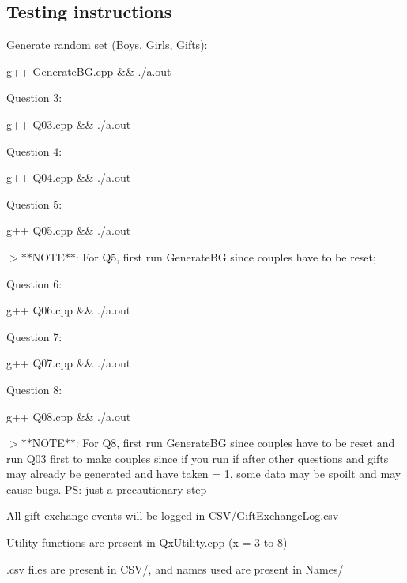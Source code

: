 \subsection*{Testing instructions}


\begin{DoxyItemize}
\item Generate random set (Boys, Girls, Gifts)\+: 
\begin{DoxyCode}
g++ GenerateBG.cpp && ./a.out
\end{DoxyCode}

\item Question 3\+: 
\begin{DoxyCode}
g++ Q03.cpp && ./a.out
\end{DoxyCode}

\item Question 4\+: 
\begin{DoxyCode}
g++ Q04.cpp && ./a.out
\end{DoxyCode}

\item Question 5\+: 
\begin{DoxyCode}
g++ Q05.cpp && ./a.out
\end{DoxyCode}
 $>$$\ast$$\ast$\+N\+O\+T\+E$\ast$$\ast$\+: For Q5, first run Generate\+BG since couples have to be reset;
\item Question 6\+: 
\begin{DoxyCode}
g++ Q06.cpp && ./a.out
\end{DoxyCode}

\item Question 7\+: 
\begin{DoxyCode}
g++ Q07.cpp && ./a.out
\end{DoxyCode}

\item Question 8\+: 
\begin{DoxyCode}
g++ Q08.cpp && ./a.out
\end{DoxyCode}
 $>$$\ast$$\ast$\+N\+O\+T\+E$\ast$$\ast$\+: For Q8, first run Generate\+BG since couples have to be reset and run Q03 first to make couples since if you run if after other questions and gifts may already be generated and have taken = 1, some data may be spoilt and may cause bugs. PS\+: just a precautionary step
\item All gift exchange events will be logged in {\ttfamily C\+S\+V/\+Gift\+Exchange\+Log.\+csv}
\item Utility functions are present in {\ttfamily Qx\+Utility.\+cpp (x = 3 to 8)}
\item .csv files are present in {\ttfamily C\+S\+V/}, and names used are present in {\ttfamily Names/}
\end{DoxyItemize}

